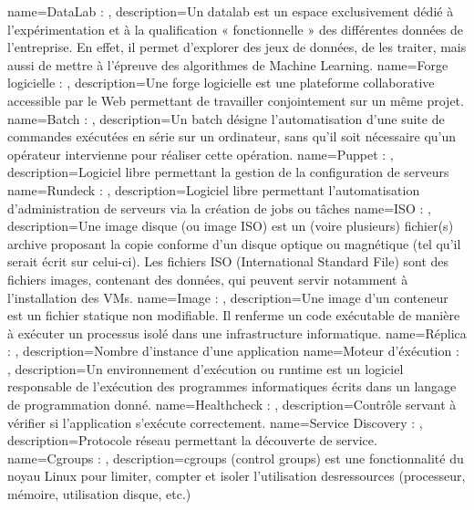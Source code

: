 {
    name=DataLab : ,
    description={Un datalab est un espace exclusivement dédié à l’expérimentation et à la qualification « fonctionnelle » des différentes données de l’entreprise. En effet, il permet d’explorer des jeux de données, de les traiter, mais aussi de mettre à l’épreuve des algorithmes de Machine Learning.}
}
{
    name=Forge logicielle : ,
    description={Une forge logicielle est une plateforme collaborative accessible par le Web permettant de travailler conjointement sur un même projet.}
}
{
    name=Batch : ,
    description={Un batch désigne l’automatisation d’une suite de commandes exécutées en série sur un ordinateur, sans qu’il soit nécessaire qu’un opérateur intervienne pour réaliser cette opération.}
}
{
    name=Puppet : ,
    description={Logiciel libre permettant la gestion de la configuration de serveurs}
}
{
    name=Rundeck : ,
    description={Logiciel libre permettant l’automatisation d’administration de serveurs via la création de jobs ou tâches}
}
{
    name=ISO : ,
    description={Une image disque (ou image ISO) est un (voire plusieurs) fichier(s) archive proposant la copie conforme d'un disque optique ou magnétique (tel qu'il serait écrit sur celui-ci). Les fichiers ISO (International Standard File) sont des fichiers images, contenant des données, qui peuvent servir notamment à l’installation des VMs.}
}
{
    name=Image : ,
    description={Une image d'un conteneur est un fichier statique non modifiable. Il renferme un code exécutable de manière à exécuter un processus isolé dans une infrastructure informatique.}
}
{
    name=Réplica : ,
    description={Nombre d’instance d’une application}
}
{
    name=Moteur d'éxécution : ,
    description={Un environnement d’exécution ou runtime est un logiciel responsable de l’exécution des programmes informatiques écrits dans un langage de programmation donné.}
}
{
    name=Healthcheck : ,
    description={Contrôle servant à vérifier si l’application s’exécute correctement.}
}
{
    name=Service Discovery : ,
    description={Protocole réseau permettant la découverte de service.}
}
{
    name=Cgroups : ,
    description={cgroups (control groups) est une fonctionnalité du noyau Linux pour limiter, compter et isoler l’utilisation desressources (processeur, mémoire, utilisation disque, etc.)}
}
